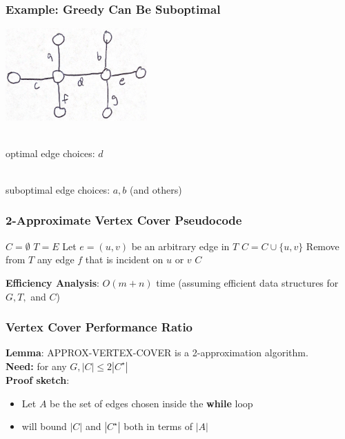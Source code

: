 \documentclass[10pt,aspectratio=169]{beamer}
\newcommand{\stanza}{ \\~\ }
\begin{document}
\begin{frame} \frametitle{Example: Greedy Can Be Suboptimal}
\begin{center}
  \includegraphics[height=100pt]{vertex-cover-counterexample.png}
  \stanza
  
  optimal edge choices: $d$ \stanza

  suboptimal edge choices: $a, b$ (and others)

\end{center}
\end{frame}
  
\begin{frame} \frametitle{2-Approximate Vertex Cover Pseudocode}
  \begin{algorithmic}[1]
      \State $C=\emptyset$
      \State $T=E$ 
        \State Let $e=(u, v)$ be an arbitrary edge in $T$
        \State $C = C \cup \{u, v \}$
        \State Remove from $T$ any edge $f$ that is incident on $u$ or $v$
      \EndWhile
      \State \Return $C$
    \EndFunction
  \end{algorithmic}
\vspace{.5cm}
\textbf{Efficiency Analysis}: $O(m+n)$ time (assuming efficient data structures
for $G, T,$ and $C$)
\end{frame}

\begin{frame} \frametitle{Vertex Cover Performance Ratio}
\textbf{Lemma}: APPROX-VERTEX-COVER is a 2-approximation algorithm. \\
\textbf{Need:} for any $G, |C| \leq 2 |C^\star|$ \\
\textbf{Proof sketch}:
\begin{itemize}
  \item Let $A$ be the set of edges chosen inside the \textbf{while} loop
  \item will bound $|C|$ and $|C^\star|$ both in terms of $|A|$
\end{itemize}
\end{frame}
  
\end{document}
